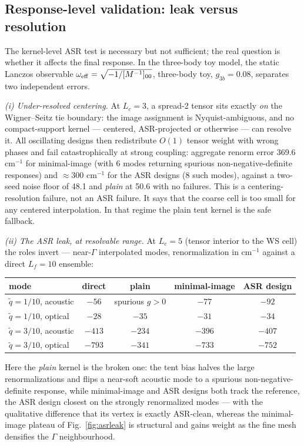 \documentclass[11pt,a4paper]{article}
\begin{document}
\subsection{Response-level validation: leak versus resolution}
\label{sec:asrresponse}

The kernel-level ASR test is necessary but not sufficient; the real
question is whether it affects the final response.  In the three-body toy
model, the static Lanczos observable
$\omega_{\rm eff} = \sqrt{-1/[M^{-1}]_{00}}$, three-body toy,
$g_{3b}{=}0.08$, separates two independent errors.

\emph{(i) Under-resolved centering.} At $L_c = 3$, a spread-2 tensor sits
exactly \emph{on} the Wigner--Seitz tie boundary: the image assignment is
Nyquist-ambiguous, and no compact-support kernel --- centered,
ASR-projected or otherwise --- can resolve it. All oscillating designs
then redistribute $O(1)$ tensor weight with wrong phases and fail
catastrophically at strong coupling: aggregate renorm error 369.6
cm$^{-1}$ for minimal-image (with 6 modes returning spurious
non-negative-definite responses) and $\approx 300$ cm$^{-1}$ for the ASR
designs (8 such modes), against a two-seed noise floor of 48.1 and
\emph{plain} at 50.6 with no failures. This is a centering-resolution
failure, not an ASR failure.  It says that the coarse cell is too small for
any centered interpolation.  In that regime the plain tent kernel is the
safe fallback.

\emph{(ii) The ASR leak, at resolvable range.} At $L_c = 5$ (tensor
interior to the WS cell) the roles invert --- near-$\Gamma$ interpolated
modes, renormalization in cm$^{-1}$ against a direct $L_f = 10$
ensemble:
\begin{center}
\begin{tabular}{lcccc}
\hline
mode & direct & plain & minimal-image & ASR design \\
\hline
$\tilde q = 1/10$, acoustic & $-56$ & spurious $g>0$ & $-77$ & $-92$ \\
$\tilde q = 1/10$, optical  & $-28$ & $-35$  & $-31$ & $-34$ \\
$\tilde q = 3/10$, acoustic & $-413$ & $-234$ & $-396$ & $-407$ \\
$\tilde q = 3/10$, optical  & $-793$ & $-341$ & $-733$ & $-752$ \\
\hline
\end{tabular}
\end{center}
Here the \emph{plain} kernel is the broken one: the tent bias halves the
large renormalizations and flips a near-soft acoustic mode to a spurious
non-negative-definite response, while minimal-image and ASR designs both
track the reference, the ASR design closest on the strongly renormalized
modes --- with the qualitative difference that its vertex is exactly
ASR-clean, whereas the minimal-image plateau of Fig.~\ref{fig:asrleak}
is structural and gains weight as the fine mesh densifies the
$\Gamma$ neighbourhood.
\end{document}
